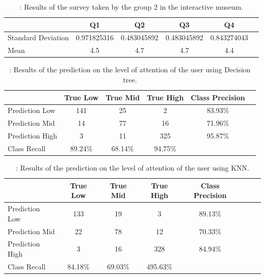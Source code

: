 \documentclass[journal]{IEEEtran}
\begin{document}
\begin{table}[H]
\caption{: Results of the survey taken by the group 2 in the interactive museum. }
\begin{tabular}{l*{4}{c}r}
									& Q1 & Q2 & Q3 & Q4  \\
\hline
Standard Deviation  & 0.971825316	& 0.483045892	& 0.483045892	& 0.843274043	\\
Mean & 4.5	& 4.7	& 4.7	& 4.4	 \\
\hline
\end{tabular}	
\end{table}



\begin{table}[H]
\caption{: Results of the prediction on the level of attention of the user using Decision tree. }
\begin{tabular}{l*{4}{c}r}
									& True Low & True Mid & True High & Class Precision \\
\hline
Prediction Low  & 141 & 25 & 2 & 83.93\% \\
Prediction Mid  & 14 & 77 & 16 & 71.96\%  \\
Prediction High & 3 & 11 & 325 & 95.87\%  \\
\hline
Class Recall    & 89.24\% & 68.14\% & 94.75\% &  \\
\end{tabular}	
\end{table}


\begin{table}[H]
\caption{: Results of the prediction on the level of attention of the user using KNN. }
\begin{tabular}{l*{6}{c}r}
									& True Low & True Mid & True High & Class Precision \\
\hline
Prediction Low  & 133 & 19 & 3 & 89.13\% \\
Prediction Mid  & 22 & 78 & 12 & 70.33\%  \\
Prediction High & 3 & 16 & 328 & 84.94\%  \\
\hline
Class Recall    & 84.18\% & 69.03\% & 495.63\% &  \\
\end{tabular}	
\end{table}
\end{document}
